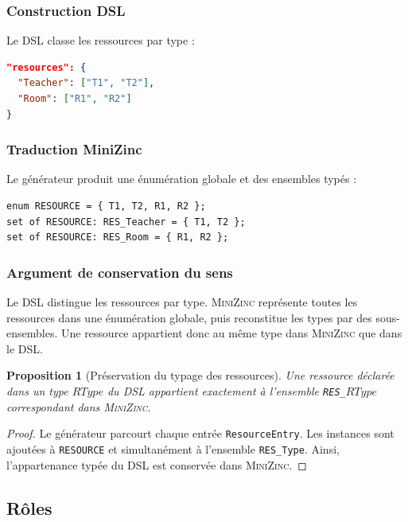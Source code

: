 \documentclass[12pt,a4paper]{article}
\newtheorem{proposition}{Proposition}[section]
\newcommand{\MZN}{\textsc{MiniZinc}}
\begin{document}
\subsubsection*{Construction DSL}

Le DSL classe les ressources par type :

\begin{lstlisting}[language=JSON]
"resources": {
  "Teacher": ["T1", "T2"],
  "Room": ["R1", "R2"]
}
\end{lstlisting}

\subsubsection*{Traduction MiniZinc}

Le générateur produit une énumération globale et des ensembles typés :

\begin{lstlisting}[language=MiniZinc]
enum RESOURCE = { T1, T2, R1, R2 };
set of RESOURCE: RES_Teacher = { T1, T2 };
set of RESOURCE: RES_Room = { R1, R2 };
\end{lstlisting}

\subsubsection*{Argument de conservation du sens}

Le DSL distingue les ressources par type. \MZN{} représente toutes les ressources dans une énumération globale, puis reconstitue les types par des sous-ensembles. Une ressource appartient donc au même type dans \MZN{} que dans le DSL.

\begin{proposition}[Préservation du typage des ressources]
Une ressource déclarée dans un type $RType$ du DSL appartient exactement à l'ensemble \texttt{RES\_$RType$} correspondant dans \MZN{}.
\end{proposition}

\begin{proof}
Le générateur parcourt chaque entrée \texttt{ResourceEntry}. Les instances sont ajoutées à \texttt{RESOURCE} et simultanément à l'ensemble \texttt{RES\_Type}. Ainsi, l'appartenance typée du DSL est conservée dans \MZN{}.
\end{proof}

\subsection{Rôles}
\end{document}
